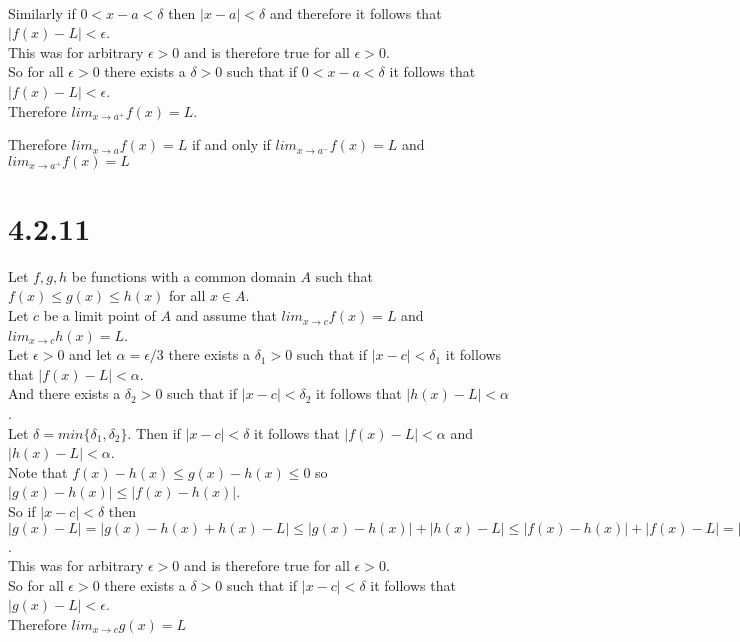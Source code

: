 \documentclass{article}
\begin{document}
\begin{center}
\begin{itemize}
        \\Similarly if $0 < x - a <\delta$ then $|x - a| <\delta$ and therefore it follows that $|f(x) - L| <\epsilon$.
        \\This was for arbitrary $\epsilon > 0$ and is therefore true for all $\epsilon > 0$.
        \\So for all $\epsilon > 0$ there exists a $\delta > 0$ such that if $0 < x - a <\delta$ it follows that $|f(x) - L| <\epsilon$.
        \\Therefore $lim _{x\rightarrow a^{+}} f(x) = L$.
    \end{itemize}
    Therefore $lim _{x\rightarrow a} f(x) = L$ if and only if $lim _{x\rightarrow a^{-}} f(x) = L$ and $lim _{x\rightarrow a^{+}} f(x) = L$ \qedsymbol
\end{center}


\newpage
\section*{4.2.11}
\begin{center}
    \doublespacing
    Let $f, g, h$ be functions with a common domain $A$ such that $f(x)\leq g(x)\leq h(x)$ for all $x\in A$.
    \\Let $c$ be a limit point of $A$ and assume that $lim _{x\rightarrow c} f(x) = L$ and $lim _{x\rightarrow c} h(x) = L$.
    \\Let $\epsilon > 0$ and let $\alpha =\epsilon / 3$ there exists a $\delta _1 > 0$ such that if $|x - c| <\delta _1$ it follows that $|f(x) - L| <\alpha$.
    \\And there exists a $\delta _2 > 0$ such that if $|x - c| <\delta _2$ it follows that $|h(x) - L| <\alpha$.
    \\Let $\delta = min\{\delta _1,\delta _2\}$. Then if $|x - c| <\delta$ it follows that $|f(x) - L| <\alpha$ and $|h(x) - L| <\alpha$.
    \\Note that $f(x) - h(x)\leq g(x) - h(x)\leq 0$ so $|g(x) - h(x)|\leq |f(x) - h(x)|$.
    \\So if $|x - c| <\delta$ then $|g(x) - L| = |g(x) - h(x) + h(x) - L|\leq |g(x) - h(x)| + |h(x) - L|\leq |f(x) - h(x)| + |f(x) - L| = |f(x) - L + L - h(x)| + |f(x) - L|\leq |f(x) - L| + |L - h(x)| + |f(x) - L| < 3\alpha =\epsilon$.
    \\This was for arbitrary $\epsilon > 0$ and is therefore true for all $\epsilon > 0$.
    \\So for all $\epsilon > 0$ there exists a $\delta > 0$ such that if $|x - c| <\delta$ it follows that $|g(x) - L| <\epsilon$.
    \\Therefore $lim _{x\rightarrow c} g(x) = L$ \qedsymbol
\end{center}
\end{document}
